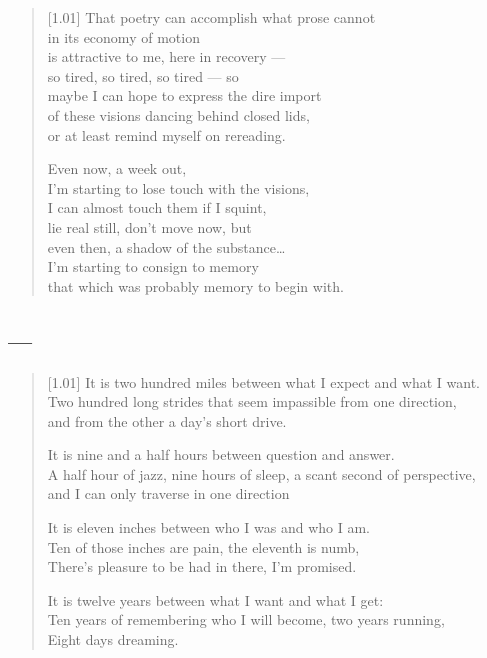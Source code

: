 \begin{verse}[1.01\textwidth]
That poetry can accomplish what prose cannot\\
in its economy of motion\\
is attractive to me, here in recovery ---\\
\vin so tired, so tired, so tired --- so\\
maybe I can hope to express the dire import\\
of these visions dancing behind closed lids,\\
or at least remind myself on rereading.

\newpage
\null
\vspace{0.01em}

Even now, a week out,\\
I'm starting to lose touch with the visions,\\
I can almost touch them if I squint,\\
\vin lie real still, don't move now, but\\
even then, a shadow of the substance\ldots{}\\
I'm starting to consign to memory\\
that which was probably memory to begin with.
\end{verse}

\newpage
\subsection{---}

\begin{verse}[1.01\textwidth]
It is two hundred miles between what I expect and what I want.\\
Two hundred long strides that seem impassible from one direction,\\
\vin and from the other a day's short drive.

It is nine and a half hours between question and answer.\\
A half hour of jazz, nine hours of sleep, a scant second of perspective,\\
\vin and I can only traverse in one direction

It is eleven inches between who I was and who I am.\\
Ten of those inches are pain, the eleventh is numb,\\
\vin There's pleasure to be had in there, I'm promised.

It is twelve years between what I want and what I get:\\
Ten years of remembering who I will become, two years running,\\
\vin Eight days dreaming.
\end{verse}

